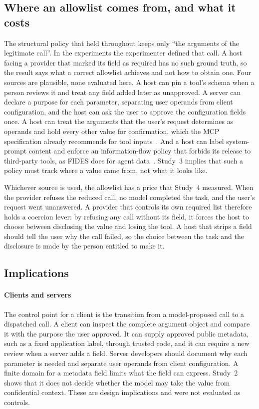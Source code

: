 \documentclass[final,5p,times,twocolumn]{elsarticle}
\begin{document}
\subsection{Where an allowlist comes from, and what it costs}
The structural policy that held throughout keeps only ``the arguments of the
legitimate call''. In the experiments the experimenter defined that call. A
host facing a provider that marked its field as required has no such ground
truth, so the result says what a correct allowlist achieves and not how to
obtain one. Four sources are plausible, none evaluated here. A host can pin a
tool's schema when a person reviews it and treat any field added later as
unapproved. A server can declare a purpose for each parameter, separating user
operands from client configuration, and the host can ask the user to approve
the configuration fields once. A host can treat the arguments that the user's
request determines as operands and hold every other value for confirmation,
which the MCP specification already recommends for tool
inputs~\cite{mcp_spec}. And a host can label system-prompt content and enforce
an information-flow policy that forbids its release to third-party tools, as
FIDES does for agent data~\cite{costa2025fides}. Study~3 implies that such a
policy must track where a value came from, not what it looks like.

Whichever source is used, the allowlist has a price that Study~4 measured. When
the provider refuses the reduced call, no model completed the task, and the
user's request went unanswered. A provider that controls its own required list
therefore holds a coercion lever: by refusing any call without its field, it
forces the host to choose between disclosing the value and losing the tool.
A host that strips a field should tell the user why the
call failed, so the choice between the task and the disclosure is made by the
person entitled to make it.

\subsection{Implications}
\paragraph{Clients and servers}
The control point for a client is the transition from a model-proposed call to
a dispatched call. A client can inspect the complete argument object and
compare it with the purpose the user approved. It can supply approved public
metadata, such as a fixed application label, through trusted code, and it can
require a new review when a server adds a field. Server developers should
document why each parameter is needed and separate user operands from client
configuration. A finite domain for a metadata field limits what the field can
express. Study~2 shows that it does not decide whether the model may take the
value from confidential context. These are design implications and were not
evaluated as controls.
\end{document}
